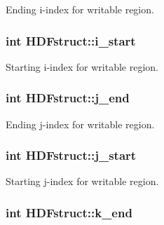 Ending i-\/index for writable region. 

\subsubsection[{\texorpdfstring{i\+\_\+start}{i_start}}]{\setlength{\rightskip}{0pt plus 5cm}int H\+D\+Fstruct\+::i\+\_\+start}\hypertarget{struct_h_d_fstruct_a45867d17153cab93cd572582a9041d4f}{}\label{struct_h_d_fstruct_a45867d17153cab93cd572582a9041d4f}


Starting i-\/index for writable region. 

\subsubsection[{\texorpdfstring{j\+\_\+end}{j_end}}]{\setlength{\rightskip}{0pt plus 5cm}int H\+D\+Fstruct\+::j\+\_\+end}\hypertarget{struct_h_d_fstruct_a631b78e781eb75647b11fc61f6a57b04}{}\label{struct_h_d_fstruct_a631b78e781eb75647b11fc61f6a57b04}


Ending j-\/index for writable region. 

\subsubsection[{\texorpdfstring{j\+\_\+start}{j_start}}]{\setlength{\rightskip}{0pt plus 5cm}int H\+D\+Fstruct\+::j\+\_\+start}\hypertarget{struct_h_d_fstruct_a4668543b5338e5c993f1daa212dd1fa2}{}\label{struct_h_d_fstruct_a4668543b5338e5c993f1daa212dd1fa2}


Starting j-\/index for writable region. 

\subsubsection[{\texorpdfstring{k\+\_\+end}{k_end}}]{\setlength{\rightskip}{0pt plus 5cm}int H\+D\+Fstruct\+::k\+\_\+end}\hypertarget{struct_h_d_fstruct_ac04611672d10126bb2ab53dc0a66535f}{}\label{struct_h_d_fstruct_ac04611672d10126bb2ab53dc0a66535f}


